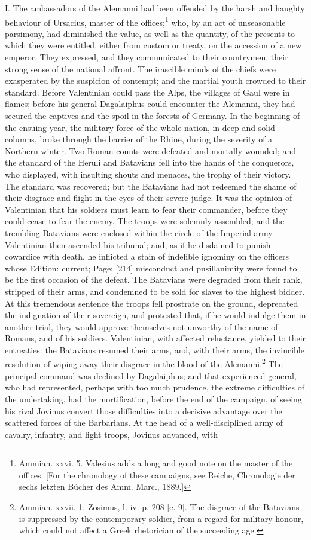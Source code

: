 I. The ambassadors of the Alemanni had been offended by the harsh and haughty behaviour of Ursacius, master of the offices;\footnote{Ammian. xxvi. 5. Valesius adds a long and good note on the master of the offices. [For the chronology of these campaigns, see Reiche, Chronologie der sechs letzten Bücher des Amm. Marc., 1889.]} who, by an act of unseasonable parsimony, had diminished the value, as well as the quantity, of the presents to which they were entitled, either from custom or treaty, on the accession of a new emperor. They expressed, and they communicated to their countrymen, their strong sense of the national affront. The irascible minds of the chiefs were exasperated by the suspicion of contempt; and the martial youth crowded to their standard. Before Valentinian could pass the Alps, the villages of Gaul were in flames; before his general Dagalaiphus could encounter the Alemanni, they had secured the captives and the spoil in the forests of Germany. In the beginning of the ensuing year, the military force of the whole nation, in deep and solid columns, broke through the barrier of the Rhine, during the severity of a Northern winter. Two Roman counts were defeated and mortally wounded; and the standard of the Heruli and Batavians fell into the hands of the conquerors, who displayed, with insulting shouts and menaces, the trophy of their victory. The standard was recovered; but the Batavians had not redeemed the shame of their disgrace and flight in the eyes of their severe judge. It was the opinion of Valentinian that his soldiers must learn to fear their commander, before they could cease to fear the enemy. The troops were solemnly assembled; and the trembling Batavians were enclosed within the circle of the Imperial army. Valentinian then ascended his tribunal; and, as if he disdained to punish cowardice with death, he inflicted a stain of indelible ignominy on the officers whose Edition: current; Page: [214] misconduct and pusillanimity were found to be the first occasion of the defeat. The Batavians were degraded from their rank, stripped of their arms, and condemned to be sold for slaves to the highest bidder. At this tremendous sentence the troops fell prostrate on the ground, deprecated the indignation of their sovereign, and protested that, if he would indulge them in another trial, they would approve themselves not unworthy of the name of Romans, and of his soldiers. Valentinian, with affected reluctance, yielded to their entreaties: the Batavians resumed their arms, and, with their arms, the invincible resolution of wiping away their disgrace in the blood of the Alemanni.\footnote{Ammian. xxvii. 1. Zosimus, l. iv. p. 208 [c. 9]. The disgrace of the Batavians is suppressed by the contemporary soldier, from a regard for military honour, which could not affect a Greek rhetorician of the succeeding age.} The principal command was declined by Dagalaiphus; and that experienced general, who had represented, perhaps with too much prudence, the extreme difficulties of the undertaking, had the mortification, before the end of the campaign, of seeing his rival Jovinus convert those difficulties into a decisive advantage over the scattered forces of the Barbarians. At the head of a well-disciplined army of cavalry, infantry, and light troops, Jovinus advanced, with 